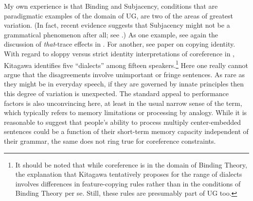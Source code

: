   My own experience is that Binding and Subjacency, conditions that are paradigmatic examples of the domain of UG, are two of the areas of greatest variation. (In fact, recent evidence suggests that Subjacency might not be a grammatical phenomenon after all; see .) As one example, see again the discussion of \textit{that}-trace effects in . For another, see  paper on copying identity. With regard to sloppy versus strict identity interpretations of coreference in , Kitagawa identifies five ``dialects'' among fifteen speakers.\footnote{It should be noted that while coreference is in the domain of Binding Theory, the explanation that Kitagawa tentatively proposes for the range of dialects involves differences in feature-copying rules rather than in the conditions of Binding Theory per se. Still, these rules are presumably part of UG too.}
  Here one really cannot argue that the disagreements involve unimportant or fringe sentences. As rare as they might be in everyday speech, if they are governed by innate principles then this degree of variation is unexpected. The standard appeal to performance factors is also unconvincing here, at least in the usual narrow sense of the term, which typically refers to memory limitations or processing by analogy. While  it is reasonable to suggest that people's ability to process multiply center-embedded sentences could be a function of their short-term memory capacity independent of their grammar, the same does not ring true for coreference constraints.

